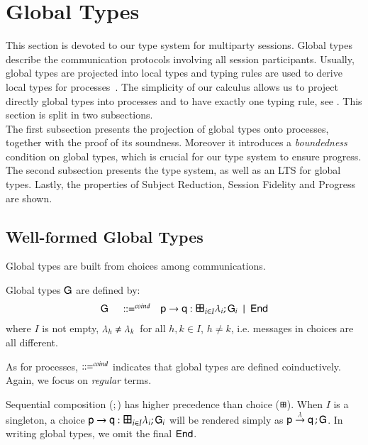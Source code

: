 
\section{Global Types}

This section is devoted to our type system for multiparty sessions.
Global types describe the communication protocols involving all
session participants.  Usually, global types are projected into local
types and typing rules are used to derive local types for
processes~\cite{CHY08,Coppo2016,CHY16}. The simplicity of our calculus
allows us to project directly global types into processes and to have
exactly one typing rule, see .
This section is split  in two subsections.\\
The first subsection presents the projection of global types onto
processes, together with the proof of its soundness. Moreover it
introduces a \emph{boundedness} condition on global types, which is
crucial for our type system to ensure  progress.\\
The second subsection presents the type system, as well as an LTS for
global types.  Lastly, the properties of Subject Reduction, Session
Fidelity and Progress are shown.

\subsection{Well-formed Global Types}\label{wfgt}
Global types are built from choices among communications.
 

\begin{definition}
Global types ${\sf G}$  are defined by: 
\[
\begin{array}{lll}
      \G~~& \coDefGr & 
    \gt\pp\q i I \la \G 
      ~\mid ~\End
  \end{array}
  \]
where $I$ is not empty, $\lambda_h\not=\lambda_k\,$ for all $h,k\in I$, $h\neq k$, i.e. messages
in choices are all different.  
\end{definition}  

As for processes, $ ::=^{coind}$ indicates that global types are 
defined coinductively. Again, we focus on \emph{regular} terms. 
%

Sequential composition ($;$) has higher precedence than choice
($\boxplus$).  %
When $I$ is a singleton, a choice $ \gt\pp\q i I \la \G$ will be
rendered simply as ${\sf p}\stackrel{\lambda}{\to}{\sf q} \, ; {\sf G}$.  In writing
global types,
we omit the final $\mathsf{End}$.

